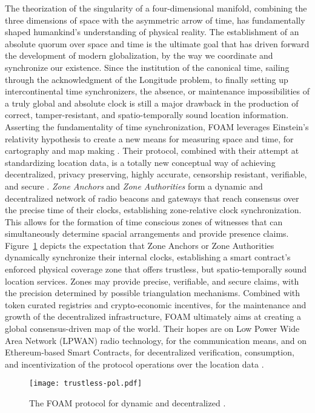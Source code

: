 The theorization of the singularity of a four-dimensional manifold, combining the three dimensions of space with the asymmetric arrow of time, has fundamentally shaped humankind's understanding of physical reality. The establishment of an absolute quorum over space and time is the ultimate goal that has driven forward the development of modern globalization, by the way we coordinate and synchronize our existence. Since the institution of the canonical time, sailing through the acknowledgment of the Longitude problem, to finally setting up intercontinental time synchronizers, the absence, or maintenance impossibilities of a truly global and absolute clock is still a major drawback in the production of correct, tamper-resistant, and spatio-temporally sound location information. Asserting the fundamentality of time synchronization, FOAM leverages Einstein's relativity hypothesis to create a new means for measuring space and time, for cartography and map making \cite{king_2020}. Their protocol, combined with their attempt at standardizing location data, is a totally new conceptual way of achieving decentralized, privacy preserving, highly accurate, censorship resistant, verifiable, and secure \pol{}. \emph{Zone Anchors} and \emph{Zone Authorities} form a dynamic and decentralized network of radio beacons and gateways that reach consensus over the precise time of their clocks, establishing zone-relative clock synchronization. This allows for the formation of time conscious zones of witnesses that can simultaneously determine spacial arrangements and provide presence claims. Figure~\ref{fig:trustless-pol} depicts the expectation that Zone Anchors or Zone Authorities dynamically synchronize their internal clocks, establishing a smart contract's enforced physical coverage zone that offers trustless, but spatio-temporally sound location services. Zones may provide precise, verifiable, and secure \pol{} claims, with the precision determined by possible triangulation mechanisms. Combined with token curated registries and crypto-economic incentives, for the maintenance and growth of the decentralized infrastructure, FOAM ultimately aims at creating a global consensus-driven map of the world. Their hopes are on Low Power Wide Area Network (LPWAN) radio technology, for the communication means, and on Ethereum-based Smart Contracts, for decentralized verification, consumption, and incentivization of the protocol operations over the location data \cite{foam-white-paper}.

\begin{figure}[ht]
    \begin{center}
    \texttt{[image: trustless-pol.pdf]}
    \caption{The FOAM protocol for dynamic and decentralized \pol{} \cite{foam-white-paper}.}
    \label{fig:trustless-pol}
    \end{center}
\end{figure}

